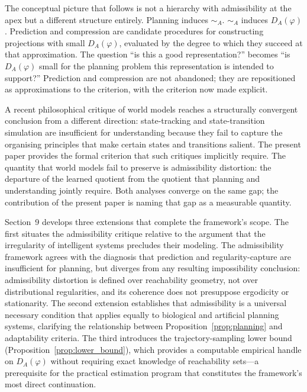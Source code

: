 \documentclass[11pt, a4paper]{article}
\theoremstyle{plain}
\theoremstyle{definition}
\theoremstyle{remark}
\newcommand{\simA}{\sim_A}
\newcommand{\DA}{D_A(\varphi)}
\begin{document}
The conceptual picture that follows is not a hierarchy with admissibility at the
apex but a different structure entirely. Planning induces $\simA$. $\simA$ induces
$\DA$. Prediction and compression are candidate procedures for constructing
projections with small $\DA$, evaluated by the degree to which they succeed at
that approximation. The question ``is this a good representation?'' becomes
``is $\DA$ small for the planning problem this representation is intended to
support?'' Prediction and compression are not abandoned; they are repositioned
as approximations to the criterion, with the criterion now made explicit.

A recent philosophical critique of world models \citep{gupta2025world} reaches
a structurally convergent conclusion from a different direction: state-tracking
and state-transition simulation are insufficient for understanding because they
fail to capture the organising principles that make certain states and transitions
salient. The present paper provides the formal criterion that such critiques
implicitly require. The quantity that world models fail to preserve is
admissibility distortion: the departure of the learned quotient from the quotient
that planning and understanding jointly require. Both analyses converge on the
same gap; the contribution of the present paper is naming that gap as a
measurable quantity.

Section~9 develops three extensions that complete the framework's scope. The first
situates the admissibility critique relative to the argument that the irregularity
of intelligent systems precludes their modeling. The admissibility framework agrees
with the diagnosis that prediction and regularity-capture are insufficient for
planning, but diverges from any resulting impossibility conclusion: admissibility
distortion is defined over reachability geometry, not over distributional
regularities, and its coherence does not presuppose ergodicity or stationarity.
The second extension establishes that admissibility is a universal necessary
condition that applies equally to biological and artificial planning systems,
clarifying the relationship between Proposition~\ref{prop:planning} and
adaptability criteria. The third introduces the trajectory-sampling lower bound
(Proposition~\ref{prop:lower_bound}), which provides a computable empirical handle
on $\DA$ without requiring exact knowledge of reachability sets---a prerequisite
for the practical estimation program that constitutes the framework's most direct
continuation.
\end{document}
